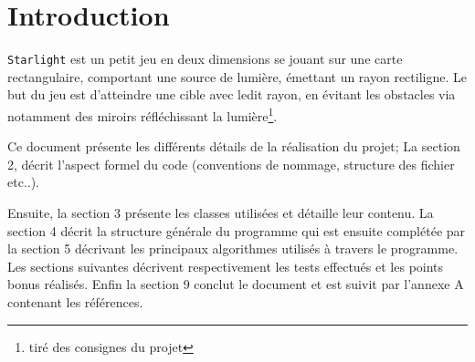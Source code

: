 \documentclass[a4paper,11pt]{report}
\begin{document}

\tableofcontents
\chapter{Introduction}
\texttt{Starlight} est un petit jeu en deux dimensions se jouant sur une carte
rectangulaire, comportant une source de lumière, émettant un rayon rectiligne. 
Le but du jeu est d’atteindre une cible avec ledit rayon, en évitant les
obstacles via notamment des miroirs réfléchissant la lumière\footnote{tiré des
consignes du projet}.

Ce document présente les différents détails de la réalisation du projet; 
La section 2, décrit l'aspect formel du code (conventions de nommage, structure
des fichier etc..).

Ensuite, la section 3 présente les classes utilisées et détaille leur contenu. 
La section 4 décrit la structure générale du programme qui est ensuite complétée
par la section 5 décrivant les principaux algorithmes utilisés à travers le
programme. Les sections suivantes décrivent respectivement les tests effectués
et les points bonus réalisés. Enfin la section 9 conclut le document et est
suivit par l'annexe A contenant les références.
\end{document}
